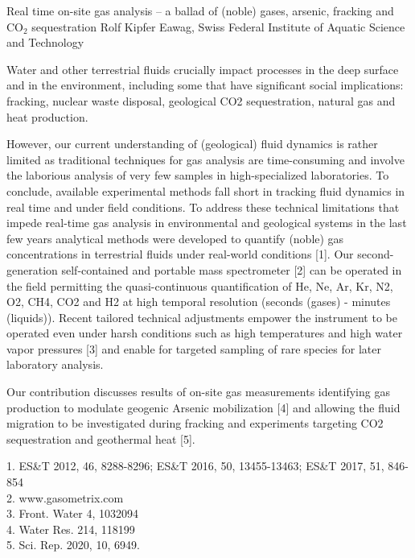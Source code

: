 \begin{conf-abstract}
{Real time on-site gas analysis -- a ballad of (noble) gases, arsenic, fracking and CO$_2$ sequestration}
{Rolf Kipfer}
{Eawag, Swiss Federal Institute of Aquatic Science and Technology}
{Water and other terrestrial fluids crucially impact processes in the deep surface and in the environment, including some that have significant social implications: fracking, nuclear waste disposal, geological CO2 sequestration, natural gas and heat production.

However, our current understanding of (geological) fluid dynamics is rather limited as traditional techniques for gas analysis are time-consuming and involve the laborious analysis of very few samples in high-specialized laboratories. To conclude, available experimental methods fall short in tracking fluid dynamics in real time and under field conditions.
To address these technical limitations that impede real-time gas analysis in environmental and geological systems in the last few years analytical methods were developed to quantify (noble) gas concentrations in terrestrial fluids under real-world conditions [1]. Our second-generation self-contained and portable mass spectrometer [2] can be operated in the field permitting the quasi-continuous quantification of He, Ne, Ar, Kr, N2, O2, CH4, CO2 and H2 at high temporal resolution (seconds (gases) - minutes (liquids)). Recent tailored technical adjustments empower the instrument to be operated even under harsh conditions such as high temperatures and high water vapor pressures [3] and enable for targeted sampling of rare species for later laboratory analysis.

Our contribution discusses results of on-site gas measurements identifying gas production to modulate geogenic Arsenic mobilization [4] and allowing the fluid migration to be investigated during fracking and experiments targeting CO2 sequestration and geothermal heat [5].

1. ES\&T 2012, 46, 8288-8296; ES\&T 2016, 50, 13455-13463; ES\&T 2017, 51, 846-854\\
2. www.gasometrix.com\\
3. Front. Water 4, 1032094\\
4. Water Res. 214, 118199\\
5. Sci. Rep. 2020, 10, 6949.}
\end{conf-abstract}
